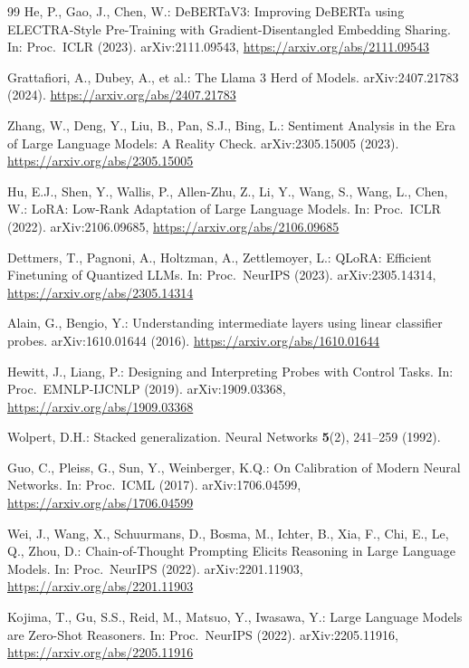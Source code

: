 \documentclass[runningheads]{llncs}
\begin{document}
\begin{thebibliography}{99}
He, P., Gao, J., Chen, W.: DeBERTaV3: Improving DeBERTa using ELECTRA-Style Pre-Training with Gradient-Disentangled Embedding Sharing. In: Proc.\ ICLR (2023). arXiv:2111.09543, \url{https://arxiv.org/abs/2111.09543}

Grattafiori, A., Dubey, A., et al.: The Llama 3 Herd of Models. arXiv:2407.21783 (2024). \url{https://arxiv.org/abs/2407.21783}

Zhang, W., Deng, Y., Liu, B., Pan, S.J., Bing, L.: Sentiment Analysis in the Era of Large Language Models: A Reality Check. arXiv:2305.15005 (2023). \url{https://arxiv.org/abs/2305.15005}

Hu, E.J., Shen, Y., Wallis, P., Allen-Zhu, Z., Li, Y., Wang, S., Wang, L., Chen, W.: LoRA: Low-Rank Adaptation of Large Language Models. In: Proc.\ ICLR (2022). arXiv:2106.09685, \url{https://arxiv.org/abs/2106.09685}

Dettmers, T., Pagnoni, A., Holtzman, A., Zettlemoyer, L.: QLoRA: Efficient Finetuning of Quantized LLMs. In: Proc.\ NeurIPS (2023). arXiv:2305.14314, \url{https://arxiv.org/abs/2305.14314}

Alain, G., Bengio, Y.: Understanding intermediate layers using linear classifier probes. arXiv:1610.01644 (2016). \url{https://arxiv.org/abs/1610.01644}

Hewitt, J., Liang, P.: Designing and Interpreting Probes with Control Tasks. In: Proc.\ EMNLP-IJCNLP (2019). arXiv:1909.03368, \url{https://arxiv.org/abs/1909.03368}

Wolpert, D.H.: Stacked generalization. Neural Networks \textbf{5}(2), 241--259 (1992). 

Guo, C., Pleiss, G., Sun, Y., Weinberger, K.Q.: On Calibration of Modern Neural Networks. In: Proc.\ ICML (2017). arXiv:1706.04599, \url{https://arxiv.org/abs/1706.04599}

Wei, J., Wang, X., Schuurmans, D., Bosma, M., Ichter, B., Xia, F., Chi, E., Le, Q., Zhou, D.: Chain-of-Thought Prompting Elicits Reasoning in Large Language Models. In: Proc.\ NeurIPS (2022). arXiv:2201.11903, \url{https://arxiv.org/abs/2201.11903}

Kojima, T., Gu, S.S., Reid, M., Matsuo, Y., Iwasawa, Y.: Large Language Models are Zero-Shot Reasoners. In: Proc.\ NeurIPS (2022). arXiv:2205.11916, \url{https://arxiv.org/abs/2205.11916}


\end{thebibliography}
\end{document}
